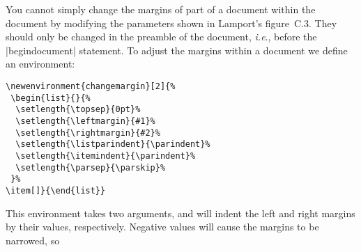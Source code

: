 You cannot simply change the margins of part of a document within the
document by
modifying the parameters shown in Lamport's figure~C.3. They
should only be changed in the preamble of the document, \emph{i.e}., before
the \cs|begin{document}| statement. To adjust the margins within a
document we define an environment:
\begin{verbatim}
\newenvironment{changemargin}[2]{%
 \begin{list}{}{%
  \setlength{\topsep}{0pt}%
  \setlength{\leftmargin}{#1}%
  \setlength{\rightmargin}{#2}%
  \setlength{\listparindent}{\parindent}%
  \setlength{\itemindent}{\parindent}%
  \setlength{\parsep}{\parskip}%
 }%
\item[]}{\end{list}}
\end{verbatim}
This environment takes two arguments, and will indent the left
and right margins by their values, respectively. Negative values
will cause the margins to be narrowed, so
